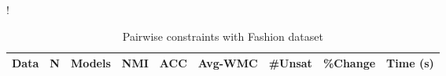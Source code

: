 \begin{table}[ht]
\caption{Pairwise constraints with Fashion dataset}\label{tab:tb-TBD}
\resizebox{\columnwidth}!{
\begin{tabular}{ | H  r | r | r | r | r | r | r | r |}
\hline
Data & N & Models & NMI & ACC & Avg-WMC & #Unsat & \%Change & Time (s)  \\  \hline
\end{tabular}
}
\end{table}